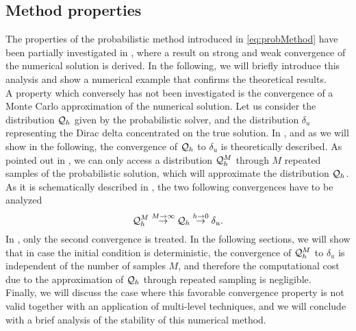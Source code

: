 \subsection{Method properties}
The properties of the probabilistic method introduced in \eqref{eq:probMethod} have been partially investigated in \cite{CGS16}, where a result on strong and weak convergence of the numerical solution is derived. In the following, we will briefly introduce this analysis and show a numerical example that confirms the theoretical results. \\
A property which conversely has not been investigated is the convergence of a Monte Carlo approximation of the numerical solution. Let us consider the distribution $\mathcal{Q}_h$ given by the probabilistic solver, and the distribution $\delta_u$ representing the Dirac delta concentrated on the true solution. In \cite{CGS16}, and as we will show in the following, the convergence of $\mathcal{Q}_h$ to $\delta_u$ is theoretically described. As pointed out in \cite{KeH16}, we can only access a distribution $\mathcal{Q}_h^M$ through $M$ repeated samples of the probabilistic solution, which will approximate the distribution $\mathcal{Q}_h$. As it is schematically described in \cite{KeH16}, the two following convergences have to be analyzed
\begin{equation}
	\mathcal{Q}_h^M \stackrel{M\to \infty}{\to} \mathcal{Q}_h \stackrel{h\to 0}{\to} \delta_u.
\end{equation}
In \cite{CGS16}, only the second convergence is treated. In the following sections, we will show that in case the initial condition is deterministic, the convergence of $\mathcal{Q}_h^M$ to $\delta_u$ is independent of the number of samples $M$, and therefore the computational cost due to the approximation of $\mathcal{Q}_h$ through repeated sampling is negligible. \\
Finally, we will discuss the case where this favorable convergence property is not valid together with an application of multi-level techniques, and we will conclude with a brief analysis of the stability of this numerical method. 





